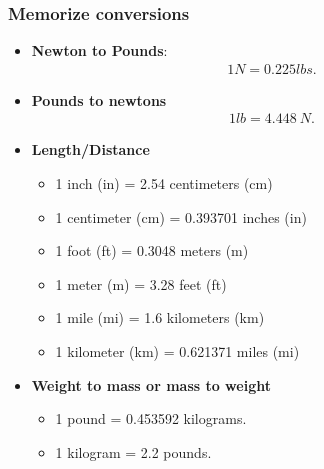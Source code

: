 \documentclass{report}
\begin{document}
    \pagebreak 
    \subsubsection{Memorize conversions}
    \begin{itemize}
        \item \textbf{Newton to Pounds}: 
            \begin{align*}
                1N = 0.225lbs
            .\end{align*}
        \item \textbf{Pounds to newtons}
            \begin{align*}
                1lb = 4.448\ N
            .\end{align*}
        \item \textbf{Length/Distance }
            \begin{itemize}
                \item 1 inch (in) = 2.54 centimeters (cm)
                \item 1 centimeter (cm) = 0.393701 inches (in)
                \item 1 foot (ft) = 0.3048 meters (m)
                \item 1 meter (m) = 3.28 feet (ft)
                \item 1 mile (mi) = 1.6 kilometers (km)
                \item 1 kilometer (km) = 0.621371 miles (mi)
            \end{itemize}
    \item \textbf{Weight to mass or mass to weight}
        \begin{itemize}
            \item 1 pound = 0.453592 kilograms.
            \item 1 kilogram = 2.2 pounds.
        \end{itemize}
    \end{itemize}



    \pagebreak 
\end{document}
